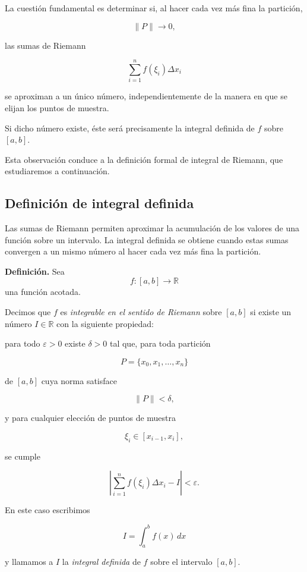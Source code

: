 \documentclass[12pt]{article}
\begin{document}
La cuestión fundamental es determinar si, al hacer cada vez más fina la
partición,

\[
\|P\|\longrightarrow0,
\]

las sumas de Riemann

\[
\sum_{i=1}^{n}f(\xi_i)\Delta x_i
\]

se aproximan a un único número, independientemente de la manera en que se
elijan los puntos de muestra.

Si dicho número existe, éste será precisamente la integral definida de
$f$ sobre $[a,b]$.

Esta observación conduce a la definición formal de integral de Riemann,
que estudiaremos a continuación.

\subsection{Definición de integral definida}

Las sumas de Riemann permiten aproximar la acumulación de los valores de
una función sobre un intervalo. La integral definida se obtiene cuando
estas sumas convergen a un mismo número al hacer cada vez más fina la
partición.

\textbf{Definición.}
Sea
\[
f:[a,b]\longrightarrow\mathbb{R}
\]
una función acotada.

Decimos que $f$ es \emph{integrable en el sentido de Riemann} sobre
$[a,b]$ si existe un número $I\in\mathbb{R}$ con la siguiente propiedad:

para todo $\varepsilon>0$ existe $\delta>0$ tal que, para toda partición

\[
P=\{x_0,x_1,\ldots,x_n\}
\]

de $[a,b]$ cuya norma satisface

\[
\|P\|<\delta,
\]

y para cualquier elección de puntos de muestra

\[
\xi_i\in[x_{i-1},x_i],
\]

se cumple

\[
\left|
\sum_{i=1}^{n}f(\xi_i)\Delta x_i-I
\right|
<\varepsilon.
\]

En este caso escribimos

\[
\boxed{
I=\int_a^b f(x)\,dx
}
\]

y llamamos a $I$ la \emph{integral definida} de $f$ sobre el intervalo
$[a,b]$.
\end{document}
